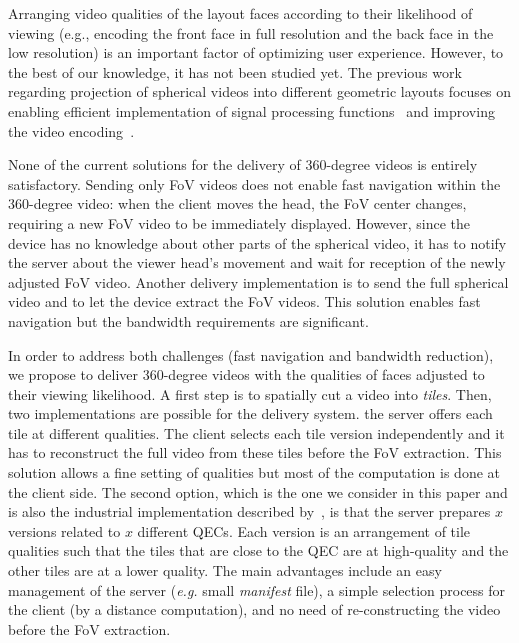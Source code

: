 Arranging video qualities of the layout faces according to their likelihood of viewing (e.g., encoding the front face in full resolution and the back face in the low resolution) is an important factor of optimizing user experience. However, to the best of our knowledge, it has not been studied yet.
The previous work regarding projection of spherical videos into different
geometric layouts focuses on enabling efficient implementation of signal processing
functions~\cite{kazhdan_metric-aware_2010} and improving the video
encoding~\cite{tosic_low_2009}.

None of the current solutions for the delivery of 360-degree videos is entirely satisfactory. Sending only FoV videos does
not enable fast navigation within the 360-degree video: when the client moves the head, the FoV
center changes, requiring a new FoV video to be immediately displayed. However, since
the device has no knowledge about other parts of the spherical video, it has to notify
the server about the viewer head's movement and wait for reception of the newly
adjusted FoV video.
Another delivery implementation is to send the full spherical video
and to let the device
extract the \ac{FoV} videos. This solution enables fast navigation but the bandwidth
requirements are
significant.

In order to address both challenges (fast navigation and bandwidth reduction), we propose to deliver 360-degree videos with the qualities of faces adjusted to their viewing likelihood. A first step is to spatially cut a video into \emph{tiles}.
Then, two implementations are possible for the delivery system.  the server
offers each tile at different qualities. The client selects each tile version independently
and it has to reconstruct
the full video from these tiles before the \ac{FoV} extraction. This solution allows a
fine setting of qualities but
most of the computation is done at the client side. The second option,
which is the one we consider in this paper and is also the industrial implementation described
by~\citet{facebook}, is that
the server prepares $x$ versions related to $x$ different \acp{QEC}. Each version
is an arrangement of tile
qualities such that the tiles that are close to the \ac{QEC} are at high-quality
and the other tiles
are at a lower quality. The main advantages include an easy management of the server
(\textit{e.g.} small \emph{manifest} file), a simple selection process for the client (by
a distance computation), and no need of re-constructing the video before the \ac{FoV} extraction.

